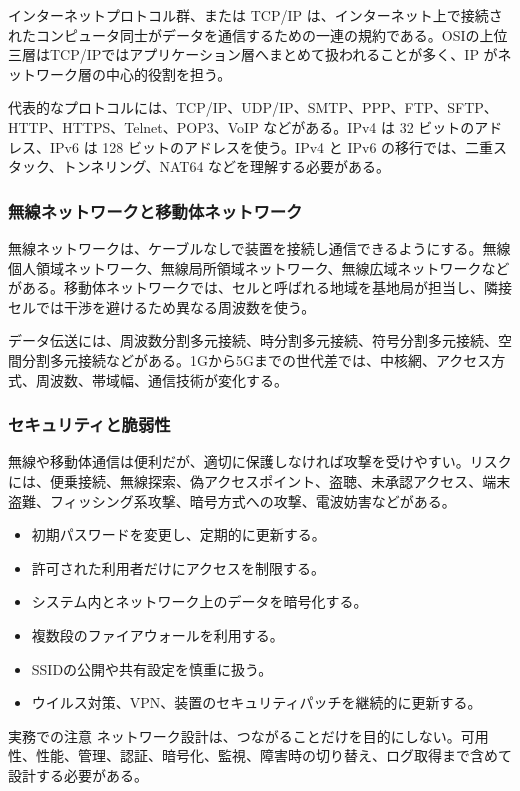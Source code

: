 インターネットプロトコル群、または TCP/IP は、インターネット上で接続されたコンピュータ同士がデータを通信するための一連の規約である。OSIの上位三層はTCP/IPではアプリケーション層へまとめて扱われることが多く、IP がネットワーク層の中心的役割を担う。

代表的なプロトコルには、TCP/IP、UDP/IP、SMTP、PPP、FTP、SFTP、HTTP、HTTPS、Telnet、POP3、VoIP などがある。IPv4 は 32 ビットのアドレス、IPv6 は 128 ビットのアドレスを使う。IPv4 と IPv6 の移行では、二重スタック、トンネリング、NAT64 などを理解する必要がある。

\subsubsection{無線ネットワークと移動体ネットワーク}

無線ネットワークは、ケーブルなしで装置を接続し通信できるようにする。無線個人領域ネットワーク、無線局所領域ネットワーク、無線広域ネットワークなどがある。移動体ネットワークでは、セルと呼ばれる地域を基地局が担当し、隣接セルでは干渉を避けるため異なる周波数を使う。

データ伝送には、周波数分割多元接続、時分割多元接続、符号分割多元接続、空間分割多元接続などがある。1Gから5Gまでの世代差では、中核網、アクセス方式、周波数、帯域幅、通信技術が変化する。

\subsubsection{セキュリティと脆弱性}

無線や移動体通信は便利だが、適切に保護しなければ攻撃を受けやすい。リスクには、便乗接続、無線探索、偽アクセスポイント、盗聴、未承認アクセス、端末盗難、フィッシング系攻撃、暗号方式への攻撃、電波妨害などがある。

\begin{itemize}[leftmargin=2em]
\item 初期パスワードを変更し、定期的に更新する。
\item 許可された利用者だけにアクセスを制限する。
\item システム内とネットワーク上のデータを暗号化する。
\item 複数段のファイアウォールを利用する。
\item SSIDの公開や共有設定を慎重に扱う。
\item ウイルス対策、VPN、装置のセキュリティパッチを継続的に更新する。
\end{itemize}

\begin{pointbox}{実務での注意}
ネットワーク設計は、つながることだけを目的にしない。可用性、性能、管理、認証、暗号化、監視、障害時の切り替え、ログ取得まで含めて設計する必要がある。

\end{pointbox}
